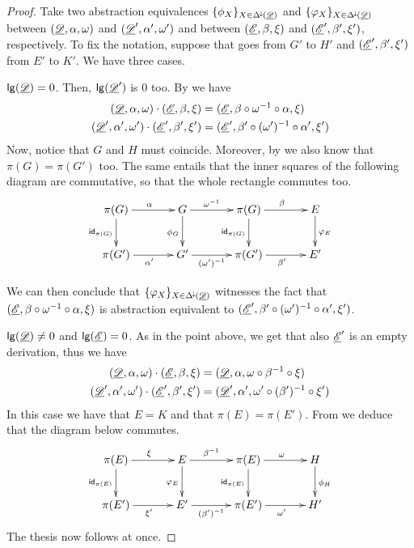 \begin{proof} Take two abstraction equivalences $\{\phi_X\}_{X\in \Delta^{\hspace{-1pt}\downarrow\hspace{-1pt}}(\underline{\mathscr{D}})}$ and $\{\varphi_X\}_{X\in \Delta^{\hspace{-1pt}\downarrow\hspace{-1pt}}(\underline{\mathscr{D}})}$ between $(\underline{\mathscr{D}}, \alpha, \omega)$ and $(\underline{\mathscr{D}}', \alpha', \omega')$ and between $(\underline{\mathscr{E}}, \beta, \xi)$ and $(\underline{\mathscr{E}}', \beta', \xi')$, respectively. To fix the notation, suppose that goes from $G'$ to $H'$ and $(\underline{\mathscr{E}}', \beta', \xi')$ from $E'$ to $K'$. We have three cases.

	\smallskip \noindent  $\mathsf{lg}(\underline{\mathscr{D}})=0$. Then, $\mathsf{lg}(\underline{\mathscr{D}}')$ is $0$ too. By  we have
		\begin{align*}
			(\underline{\mathscr{D}}, \alpha, \omega)\cdot (\underline{\mathscr{E}}, \beta, \xi)&=(\underline{\mathscr{E}}, \beta\circ \omega^{-1}\circ \alpha, \xi)\\
			(\underline{\mathscr{D}}', \alpha', \omega')\cdot (\underline{\mathscr{E}}', \beta', \xi')&=(\underline{\mathscr{E}}', \beta'\circ (\omega')^{-1}\circ \alpha', \xi')
		\end{align*}
		Now, notice that $G$ and $H$ must coincide. Moreover, by  we also know that $\pi(G)=\pi(G')$ too. The same  entails that the inner squares of the following diagram are commutative, so that the whole rectangle commutes too.
		\[\xymatrix@C=35pt{\pi(G) \ar[r]^{\alpha} \ar[d]_{\id{\pi(G)}}& G  \ar[d]_{\phi_G}\ar[r]^-{\omega^{-1}} & \pi(G) \ar[d]_{\id{\pi(G)}} \ar[r]^{\beta}& E \ar[d]^{\varphi_E}\\\pi(G') \ar[r]_{\alpha'}& G' \ar[r]_-{(\omega')^{-1}} & \pi(G') \ar[r]_{\beta'} & E'}\]
		
		We can  then conclude that $\{\varphi_X\}_{X\in \Delta^{\hspace{-1pt}\downarrow\hspace{-1pt}}(\underline{\mathscr{D}})}$ witnesses the fact that $(\underline{\mathscr{E}}, \beta\circ \omega^{-1}\circ \alpha, \xi)$ is abstraction equivalent to $(\underline{\mathscr{E}}', \beta'\circ (\omega')^{-1}\circ \alpha', \xi')$.
		
\smallskip \noindent  $\mathsf{lg}(\underline{\mathscr{D}})\neq 0$ and $\mathsf{lg}(\underline{\mathscr{E}})= 0$. As in the point above, we get that also $\underline{\mathscr{E}}'$  is an empty derivation, thus we have
		\begin{align*}
			(\underline{\mathscr{D}}, \alpha, \omega)\cdot (\underline{\mathscr{E}}, \beta, \xi)&=(\underline{\mathscr{D}},  \alpha, \omega \circ \beta^{-1}\circ \xi)\\
			(\underline{\mathscr{D}}', \alpha', \omega')\cdot (\underline{\mathscr{E}}', \beta', \xi')&=(\underline{\mathscr{D}}',  \alpha', \omega' \circ (\beta')^{-1}\circ \xi')
		\end{align*}
		In this case we have that $E=K$ and that $\pi(E)=\pi(E')$. From  we deduce that the diagram below commutes.
		\[\xymatrix@C=35pt{\pi(E) \ar[r]^{\xi} \ar[d]_{\id{\pi(E)}}& E  \ar[d]_{\varphi_E}\ar[r]^-{\beta^{-1}} & \pi(E) \ar[d]_{\id{\pi(E)}} \ar[r]^{\omega}& H \ar[d]^{\phi_H}\\\pi(E') \ar[r]_{\xi'}& E' \ar[r]_-{(\beta')^{-1}} & \pi(E') \ar[r]_{\omega'} & H'}\]
		The thesis now follows at once.
		

\end{proof}
